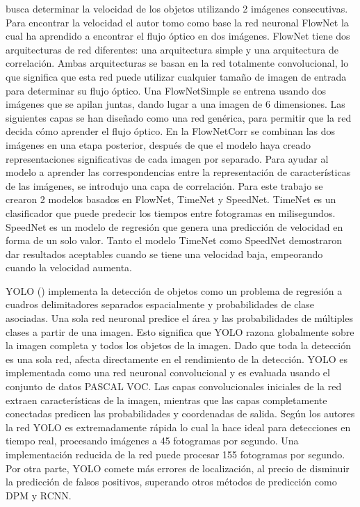 \citeauthor{loor2017Visual} busca determinar la velocidad de los objetos utilizando 2 imágenes consecutivas. Para encontrar la velocidad el autor tomo como base la red neuronal FlowNet la cual ha aprendido a encontrar el flujo óptico en dos imágenes. FlowNet tiene dos arquitecturas de red diferentes: una arquitectura simple y una arquitectura de correlación. Ambas arquitecturas se basan en la red totalmente convolucional, lo que significa que esta red puede utilizar cualquier tamaño de imagen de entrada para determinar su flujo óptico. Una FlowNetSimple se entrena usando dos imágenes que se apilan juntas, dando lugar a una imagen de 6 dimensiones. Las siguientes capas se han diseñado como una red genérica, para permitir que la red decida cómo aprender el flujo óptico. En la FlowNetCorr se combinan las dos imágenes en una etapa posterior, después de que el modelo haya creado representaciones significativas de cada imagen por separado. Para ayudar al modelo a aprender las correspondencias entre la representación de características de las imágenes, se introdujo una capa de correlación. Para este trabajo se crearon 2 modelos basados en FlowNet, TimeNet y SpeedNet. TimeNet es un clasificador que puede predecir los tiempos entre fotogramas en milisegundos. SpeedNet es un modelo de regresión que genera una predicción de velocidad en forma de un solo valor. Tanto el modelo TimeNet como SpeedNet demostraron dar resultados aceptables cuando se tiene una velocidad baja, empeorando cuando la velocidad aumenta.

YOLO (\cite{redmon2016Yolo}) implementa la detección de objetos como un problema de regresión a cuadros delimitadores separados espacialmente y probabilidades de clase asociadas. Una sola red neuronal predice el área y las probabilidades de múltiples clases a partir de una imagen. Esto significa que YOLO razona globalmente sobre la imagen completa y todos los objetos de la imagen. Dado que toda la detección es una sola red, afecta directamente en el rendimiento de la detección. YOLO es implementada como una red neuronal convolucional y es evaluada usando el conjunto de datos PASCAL VOC. Las capas convolucionales iniciales de la red extraen características de la imagen, mientras que las capas completamente conectadas predicen las probabilidades y coordenadas de salida. Según los autores la red YOLO es extremadamente rápida lo cual la hace ideal para detecciones en tiempo real, procesando imágenes a 45 fotogramas por segundo. Una implementación reducida de la red puede procesar 155 fotogramas por segundo. Por otra parte, YOLO comete más errores de localización, al precio de disminuir la predicción de falsos positivos, superando otros métodos de predicción como DPM y RCNN.
